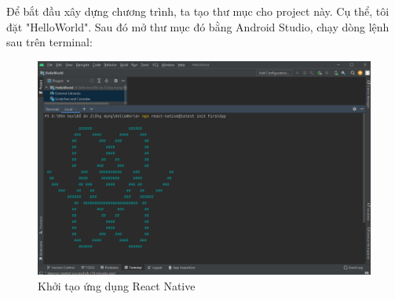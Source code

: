 Để bắt đầu xây dựng chương trình, ta tạo thư mục cho project này. Cụ thể, tôi đặt "HelloWorld". Sau đó mở thư mục đó bằng Android Studio, chạy dòng lệnh sau trên terminal:
\begin{figure}[!ht]
    \centering
    \includegraphics[scale=0.5]{images/createFirstApp.png}
    \caption{Khởi tạo ứng dụng React Native}
\end{figure}

